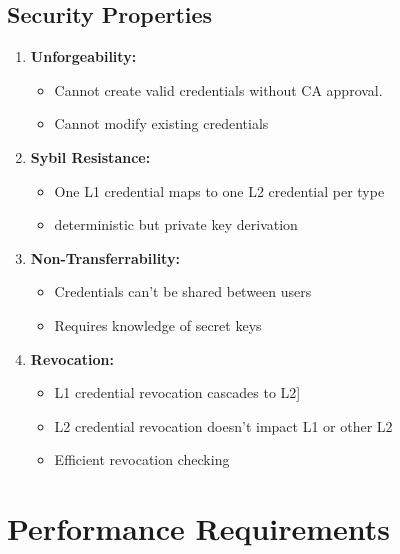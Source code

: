 \subsection{Security Properties}
\begin{enumerate}
    \item \textbf{Unforgeability:} 
    \begin{itemize}
        \item Cannot create valid credentials without CA approval. 
        \item Cannot modify existing credentials
    \end{itemize}

    \item \textbf{Sybil Resistance:}
    \begin{itemize}
        \item One L1 credential maps to one L2 credential per type
        \item deterministic but private key derivation
    \end{itemize}

    \item \textbf{Non-Transferrability:}
    \begin{itemize}
        \item Credentials can't be shared between users
        \item Requires knowledge of secret keys
    \end{itemize}

    \item \textbf{Revocation: }
    \begin{itemize}
        \item L1 credential revocation cascades to L2]
        \item L2 credential revocation doesn't impact L1 or other L2
        \item Efficient revocation checking
    \end{itemize}
\end{enumerate}

\section{Performance Requirements}

